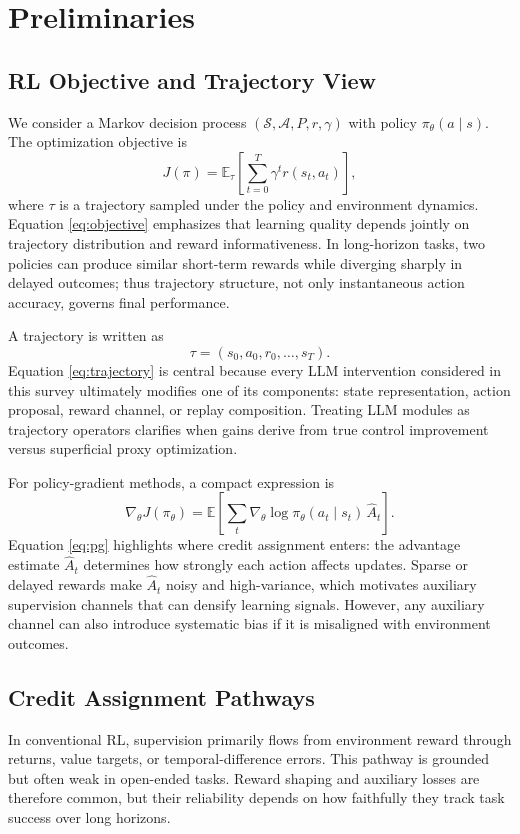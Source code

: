 \documentclass[pdflatex,sn-mathphys-num]{sn-jnl}
\begin{document}
\section{Preliminaries}
\subsection{RL Objective and Trajectory View}
We consider a Markov decision process $(\mathcal{S},\mathcal{A},P,r,\gamma)$ with policy $\pi_\theta(a\mid s)$. The optimization objective is
\begin{equation}
J(\pi)=\mathbb{E}_{\tau}\left[\sum_{t=0}^{T}\gamma^t r(s_t,a_t)\right],
\label{eq:objective}
\end{equation}
where $\tau$ is a trajectory sampled under the policy and environment dynamics. Equation \eqref{eq:objective} emphasizes that learning quality depends jointly on trajectory distribution and reward informativeness. In long-horizon tasks, two policies can produce similar short-term rewards while diverging sharply in delayed outcomes; thus trajectory structure, not only instantaneous action accuracy, governs final performance.

A trajectory is written as
\begin{equation}
\tau=(s_0,a_0,r_0,\ldots,s_T).
\label{eq:trajectory}
\end{equation}
Equation \eqref{eq:trajectory} is central because every LLM intervention considered in this survey ultimately modifies one of its components: state representation, action proposal, reward channel, or replay composition. Treating LLM modules as trajectory operators clarifies when gains derive from true control improvement versus superficial proxy optimization.

For policy-gradient methods, a compact expression is
\begin{equation}
\nabla_{\theta}J(\pi_\theta)=\mathbb{E}\left[\sum_t \nabla_{\theta}\log\pi_\theta(a_t\mid s_t)\,\hat{A}_t\right].
\label{eq:pg}
\end{equation}
Equation \eqref{eq:pg} highlights where credit assignment enters: the advantage estimate $\hat{A}_t$ determines how strongly each action affects updates. Sparse or delayed rewards make $\hat{A}_t$ noisy and high-variance, which motivates auxiliary supervision channels that can densify learning signals. However, any auxiliary channel can also introduce systematic bias if it is misaligned with environment outcomes.

\subsection{Credit Assignment Pathways}
In conventional RL, supervision primarily flows from environment reward through returns, value targets, or temporal-difference errors. This pathway is grounded but often weak in open-ended tasks. Reward shaping and auxiliary losses are therefore common, but their reliability depends on how faithfully they track task success over long horizons.
\end{document}
